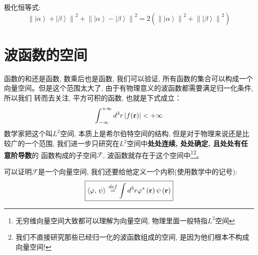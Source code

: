极化恒等式:
\[{\left\| {\left| \alpha  \right\rangle  + \left| \beta  \right\rangle } \right\|^2} + {\left\| {\left| \alpha  \right\rangle  - \left| \beta  \right\rangle } \right\|^2} = 2\left( {{{\left\| {\left| \alpha  \right\rangle } \right\|}^2} + {{\left\| {\left| \beta  \right\rangle } \right\|}^2}} \right)\]
\section{波函数的空间}
函数的和还是函数, 数乘后也是函数, 我们可以验证, 所有函数的集合可以构成一个向量空间。但是这个范围太大了, 由于有物理意义的波函数都需要满足归一化条件, 所以我们
转而去关注, 平方可积的函数, 也就是下式成立：
\[\int_{ - \infty }^{ + \infty } {{d^3}r\left| {f({\bf{r}})} \right|}  <  + \infty \]
数学家把这个叫$L^2$空间, 本质上是希尔伯特空间的结构, 但是对于物理来说还是比较广的一个范围, 我们进一步只研究在$L^2$空间中\textbf{处处连续, 处处确定, 且处处有任意阶导数}的
函数构成的子空间$\mathscr{F}$, 波函数就存在于这个空间中\footnote[1]{无穷维向量空间大致都可以理解为向量空间, 物理里面一般特指$L^2$空间}\footnote[2]{我们不直接研究那些已经归一化的波函数组成的空间, 是因为他们根本不构成向量空间!}。

可以证明$\mathscr{F}$是一个向量空间, 我们还要给他定义一个内积(使用数学中的记号):
\begin{equation}
    \boxed{\left\langle {\varphi ,\left. \psi  \right\rangle } \right. \overset{def}{=} \int {{d^3}r} {\varphi ^*}\left( {\bf{r}} \right)\psi \left( {\bf{r}} \right)}
\end{equation}
